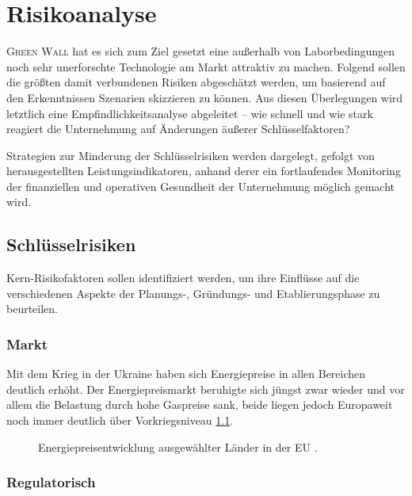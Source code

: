 \chapter{Risikoanalyse}

\textsc{Green Wall} hat es sich zum Ziel gesetzt eine außerhalb von Laborbedingungen noch sehr unerforschte Technologie am Markt attraktiv zu machen.
Folgend sollen die größten damit verbundenen Risiken abgeschätzt werden, um basierend auf den Erkenntnissen Szenarien skizzieren zu können.
Aus diesen Überlegungen wird letztlich eine Empfindlichkeitsanalyse abgeleitet -- wie schnell und wie stark reagiert die Unternehmung auf Änderungen äußerer Schlüsselfaktoren?\par\medskip

Strategien zur Minderung der Schlüsselrisiken werden dargelegt, gefolgt von herausgestellten Leistungsindikatoren, anhand derer ein fortlaufendes Monitoring der finanziellen und operativen Gesundheit der Unternehmung möglich gemacht wird.

\section{Schlüsselrisiken}

Kern-Risikofaktoren sollen identifiziert werden, um ihre Einflüsse auf die verschiedenen Aspekte der Planungs-, Gründungs- und Etablierungsphase zu beurteilen.

\subsection{Markt}

Mit dem Krieg in der Ukraine haben sich Energiepreise in allen Bereichen deutlich erhöht.
Der Energiepreismarkt beruhigte sich jüngst zwar wieder und vor allem die Belastung durch hohe Gaspreise sank, beide liegen jedoch Europaweit noch immer deutlich über Vorkriegsniveau \cref{fig:energiepreise}.

\begin{figure}[h]
    \centering
    
    \caption[Energiepreisentwicklung ausgewählter Länder in der EU]{Energiepreisentwicklung ausgewählter Länder in der EU \cite{Dataset.Eurostat.EnergyStatisticsNaturalGasAndElectricityPricesfrom2007Onwards.2024}.}\label{fig:energiepreise}
\end{figure}


\subsection{Regulatorisch}

